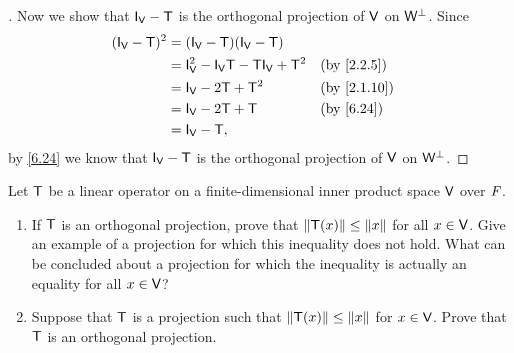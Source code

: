 \begin{proof}[]
  Now we show that \(\IT[\V] - \T\) is the orthogonal projection of \(\mathsf{V}\) on \(\mathsf{W}^{\perp}\).
  Since
  \begin{align*}
    (\IT[\V] - \T)^2 & = (\IT[\V] - \T)(\IT[\V] - \T)                                \\
                     & = \IT[\V]^2 - \IT[\V] \T - \T \IT[\V] + \T^2 &  & \by{2.2.5}  \\
                     & = \IT[\V] - 2 \T + \T^2                      &  & \by{2.1.10} \\
                     & = \IT[\V] - 2 \T + \T                        &  & \by{6.24}   \\
                     & = \IT[\V] - \T,
  \end{align*}
  by \cref{6.24} we know that \(\IT[\V] - \T\) is the orthogonal projection of \(\mathsf{V}\) on \(\mathsf{W}^{\perp}\).
\end{proof}

\begin{ex}\label{ex:6.6.5}
  Let \(\mathsf{T}\) be a linear operator on a finite-dimensional inner product space \(\mathsf{V}\) over \(\mathit{F}\).
  \begin{enumerate}
    \item If \(\mathsf{T}\) is an orthogonal projection, prove that \(\left\lVert\mathsf{T}(x)\right\rVert \leq \left\lVert x\right\rVert\) for all \(x \in \mathsf{V}\).
          Give an example of a projection for which this inequality does not hold.
          What can be concluded about a projection for which the inequality is actually an equality for all \(x \in \mathsf{V}\)?
    \item Suppose that \(\mathsf{T}\) is a projection such that \(\left\lVert\mathsf{T}(x)\right\rVert \leq \left\lVert x\right\rVert\) for \(x \in \mathsf{V}\).
          Prove that \(\mathsf{T}\) is an orthogonal projection.
  \end{enumerate}
\end{ex}

